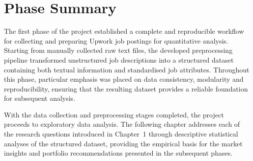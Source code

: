 \section[Phase 1 Summary]{Phase Summary}

The first phase of the project established a complete and reproducible workflow for collecting and preparing Upwork job postings for
quantitative analysis. Starting from manually collected raw text files, the developed preprocessing pipeline transformed unstructured
job descriptions into a structured dataset containing both textual information and standardised job attributes.
Throughout this phase, particular emphasis was placed on data consistency, modularity and reproducibility, ensuring that
the resulting dataset provides a reliable foundation for subsequent analysis.

With the data collection and preprocessing stages completed, the project proceeds to exploratory data analysis.
The following chapter addresses each of the research questions introduced in Chapter~1 through descriptive statistical analyses of
the structured dataset, providing the empirical basis for the market insights and portfolio recommendations presented in the subsequent phases.